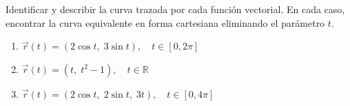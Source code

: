 Identificar y describir la curva trazada por cada función vectorial. En cada caso, encontrar la curva equivalente en forma cartesiana eliminando el parámetro $t$.
\begin{enumerate}
    \item $\vec{r}(t) = (2\cos t,\; 3\sin t),\quad t \in [0, 2\pi]$
    \item $\vec{r}(t) = (t,\; t^2 - 1),\quad t \in \mathbb{R}$
    \item $\vec{r}(t) = (2\cos t,\; 2\sin t,\; 3t),\quad t \in [0, 4\pi]$
\end{enumerate}